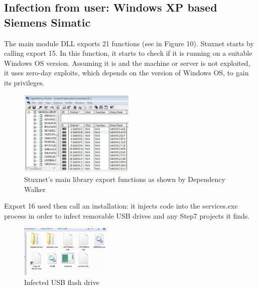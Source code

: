\documentclass[conference]{IEEEtran}
\begin{document}
\subsection{Infection from user: Windows XP based Siemens Simatic}

The main module DLL exports 21 functions (see in Figure 10). Stuxnet starts by calling export 15. In this function, it starts to check if it is running on a suitable Windows OS version. Assuming it is and the machine or server is not exploited, it uses  zero-day exploits, which depends on the version of Windows OS, to gain its privileges.


\begin{figure}[!htb]
	\includegraphics[width=0.49\textwidth]{images/walker.png}
	\caption{ Stuxnet’s main library export functions as shown by Dependency Walker %
	}
	\label{fig:fb}
\end{figure}


Export 16 used then call an installation: it injects code into the services.exe process in order to infect removable USB drives and any Step7  projects it finds. 

\begin{figure}[!htb]
	\includegraphics[width=0.39\textwidth]{images/STUXNET1.png}
	\caption{Infected USB flash drive %
	}
	\label{fig:fb}
\end{figure}
\end{document}
